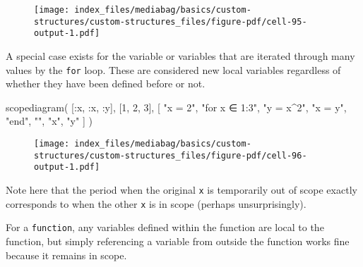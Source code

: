 \documentclass[
  letterpaper,
  DIV=11,
  numbers=noendperiod]{scrreprt}
\newenvironment{Shaded}{\begin{snugshade}}{\end{snugshade}}
\newcommand{\FloatTok}[1]{\textcolor[rgb]{0.68,0.00,0.00}{#1}}
\newcommand{\FunctionTok}[1]{\textcolor[rgb]{0.28,0.35,0.67}{#1}}
\newcommand{\NormalTok}[1]{\textcolor[rgb]{0.00,0.23,0.31}{#1}}
\newcommand{\OperatorTok}[1]{\textcolor[rgb]{0.37,0.37,0.37}{#1}}
\newcommand{\StringTok}[1]{\textcolor[rgb]{0.13,0.47,0.30}{#1}}
\begin{document}
\begin{figure}[H]

{\centering \texttt{[image: index\_files/mediabag/basics/custom-structures/custom-structures\_files/figure-pdf/cell-95-output-1.pdf]}

}

\end{figure}

A special case exists for the variable or variables that are iterated
through many values by the \texttt{for} loop. These are considered new
local variables regardless of whether they have been defined before or
not.

\begin{Shaded}
\begin{Highlighting}[]
\FunctionTok{scopediagram}\NormalTok{(}
\NormalTok{    [}\OperatorTok{:}\NormalTok{x, }\OperatorTok{:}\NormalTok{x, }\OperatorTok{:}\NormalTok{y], [}\FloatTok{1}\NormalTok{, }\FloatTok{2}\NormalTok{, }\FloatTok{3}\NormalTok{],}
\NormalTok{    [}
        \StringTok{"x = 2"}\NormalTok{,}
        \StringTok{"for x ∈ 1:3"}\NormalTok{,}
        \StringTok{"y = x\^{}2"}\NormalTok{,}
        \StringTok{"x = y"}\NormalTok{,}
        \StringTok{"end"}\NormalTok{,}
        \StringTok{""}\NormalTok{,}
        \StringTok{"x"}\NormalTok{,}
        \StringTok{"y"}
\NormalTok{    ]}
\NormalTok{)}
\end{Highlighting}
\end{Shaded}

\begin{figure}[H]

{\centering \texttt{[image: index\_files/mediabag/basics/custom-structures/custom-structures\_files/figure-pdf/cell-96-output-1.pdf]}

}

\end{figure}

Note here that the period when the original \texttt{x} is temporarily
out of scope exactly corresponds to when the other \texttt{x} is in
scope (perhaps unsurprisingly).

For a \texttt{function}, any variables defined within the function are
local to the function, but simply referencing a variable from outside
the function works fine because it remains in scope.
\end{document}
